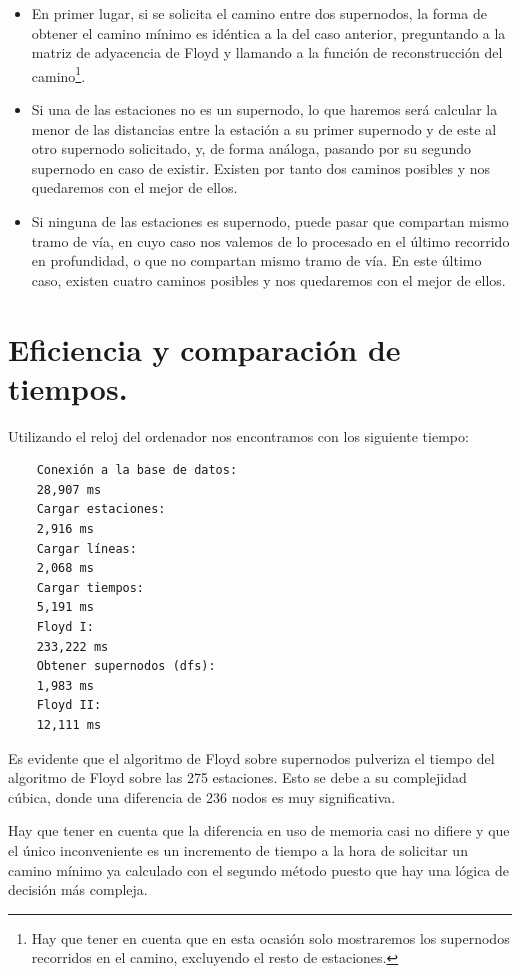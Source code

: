 \documentclass[spanish, a4paper, 12pt] {article}
\begin{document}
\begin{itemize}
\item{
En primer lugar, si se solicita el camino entre dos supernodos, la forma de obtener el camino mínimo es idéntica a la del caso anterior, preguntando a la matriz de adyacencia de Floyd y llamando a la función de reconstrucción del camino\footnote{Hay que tener en cuenta que en esta ocasión solo mostraremos los supernodos recorridos en el camino, excluyendo el resto de estaciones.}.
}
\item{
Si una de las estaciones no es un supernodo, lo que haremos será calcular la menor de las distancias entre la estación a su primer supernodo y de este al otro supernodo solicitado, y, de forma análoga, pasando por su segundo supernodo en caso de existir. Existen por tanto dos caminos posibles y nos quedaremos con el mejor de ellos.
}
\item{
Si ninguna de las estaciones es supernodo, puede pasar que compartan mismo tramo de vía, en cuyo caso nos valemos de lo procesado en el último recorrido en profundidad, o que no compartan mismo tramo de vía. En este último caso, existen cuatro caminos posibles y nos quedaremos con el mejor de ellos.
}
\end{itemize}
\section{Eficiencia y comparación de tiempos.}
Utilizando el reloj del ordenador nos encontramos con los siguiente tiempo:
\begin{verbatim}
    Conexión a la base de datos:
    28,907 ms
    Cargar estaciones:
    2,916 ms
    Cargar líneas:
    2,068 ms
    Cargar tiempos:
    5,191 ms
    Floyd I:
    233,222 ms
    Obtener supernodos (dfs):
    1,983 ms
    Floyd II:
    12,111 ms
\end{verbatim}
Es evidente que el algoritmo de Floyd sobre supernodos pulveriza el tiempo del algoritmo de Floyd sobre las 275 estaciones. Esto se debe a su complejidad cúbica, donde una diferencia de 236 nodos es muy significativa.\\ \par
Hay que tener en cuenta que la diferencia en uso de memoria casi no difiere y que el único inconveniente es un incremento de tiempo a la hora de solicitar un camino mínimo ya calculado con el segundo método puesto que hay una lógica de decisión más compleja.
\end{document}
